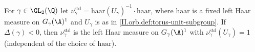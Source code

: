 For $\gamma\in\GL_2(\Q)$ let $\nu_\gamma^{\mathrm{std}}=\mathrm{haar}(U_\gamma)^{-1}\cdot\mathrm{haar}$, where $\mathrm{haar}$ is a fixed left Haar measure on $G_\gamma(\A)^1$ and $U_\gamma$ is as in
\cref{II.orb.def:torus-unit-subgroup}. If $\Delta(\gamma)<0$, then $\nu_\gamma^{\mathrm{std}}$ is the left Haar measure on $G_\gamma(\A)^1$ with $\nu_\gamma^{\mathrm{std}}(U_\gamma)=1$
(independent of the choice of $\mathrm{haar}$).
